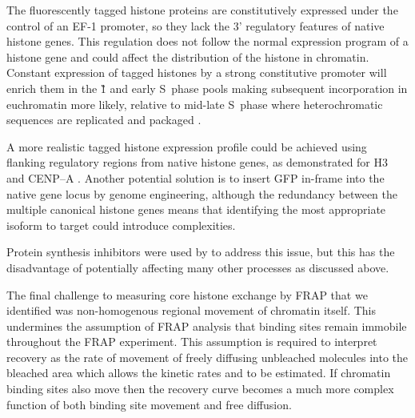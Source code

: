     The fluorescently tagged histone proteins are constitutively expressed
    under the control of an EF-1\textalpha{} promoter,
    so they lack the 3' regulatory features of native histone genes.
    This regulation does not follow the normal
    expression program of a histone gene
    and could affect the distribution of the histone in chromatin.
    Constant expression of tagged histones by a strong constitutive promoter
    will enrich them in the \G1{} and early S~phase pools
    making subsequent incorporation in euchromatin more likely,
    relative to mid-late S~phase where heterochromatic sequences
    are replicated and packaged \citep{DNA-replication-timing}.

    A more realistic tagged histone expression profile could be achieved using
    flanking regulatory regions from native histone genes,
    as demonstrated for H3 and CENP--A \citep{pMH3-plasmid,Kevin-pCA-TAG}.
    Another potential solution is to insert GFP
    in-frame into the native gene locus by genome engineering,
    although the redundancy between the multiple canonical histone genes means
    that identifying the most appropriate isoform to target
    could introduce complexities.

    Protein synthesis inhibitors were used by \citet{KimuraCook}
    to address this issue,
    but this has the disadvantage of potentially affecting
    many other processes as discussed above.



    The final challenge to measuring core histone
    exchange by FRAP that we identified
    was non-homogenous regional movement of chromatin itself.
    This undermines the assumption of FRAP analysis that binding sites
    remain immobile throughout the FRAP experiment.
    This assumption is required to interpret recovery
    as the rate of movement of freely diffusing unbleached molecules into the
    bleached area which allows the kinetic
    rates \kon{} and \koff{} to be estimated.
    If chromatin binding sites also move then the recovery curve becomes a
    much more complex function of both binding site movement and free diffusion.

